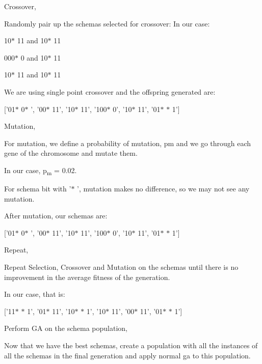 \documentclass[12pt]{article}
\renewcommand{\_}{\kern-1.5pt\textunderscore\kern-1.5pt}
\begin{document}
Crossover, \par

Randomly pair up the schemas selected for crossover: In our case:\par

10$\ast$ 11 and 10$\ast$ 11\par

000$\ast$ 0 and 10$\ast$ 11\par

10$\ast$ 11 and 10$\ast$ 11\par

We are using single point crossover and the offspring generated are:\par

[’01$\ast$ 0$\ast$ ’, ’00$\ast$ 11’, ’10$\ast$ 11’, ’100$\ast$ 0’, ’10$\ast$ 11’, ’01$\ast$ $\ast$ 1’]\par

Mutation, \par

For mutation, we define a probability of mutation, pm and we go through each gene of the chromosome and mutate them.\par

In our case, p\textsubscript{m} = 0.02.\par

For schema bit with ’$\ast$ ’, mutation makes no difference, so we may not see any mutation. \par

After mutation, our schemas are:\par

[’01$\ast$ 0$\ast$ ’, ’00$\ast$ 11’, ’10$\ast$ 11’, ’100$\ast$ 0’, ’10$\ast$ 11’, ’01$\ast$ $\ast$ 1’]\par

Repeat, \par

Repeat Selection, Crossover and Mutation on the schemas until there is no improvement in the average fitness of the generation.\par

In our case, that is:\par

[’11$\ast$ $\ast$ 1’, ’01$\ast$ 11’, ’10$\ast$ $\ast$ 1’, ’10$\ast$ 11’, ’00$\ast$ 11’, ’01$\ast$ $\ast$ 1’]\par

Perform GA on the schema population, \par

Now that we have the best schemas, create a population with all the instances of all the schemas in the final generation and apply normal ga to this population.\par
\end{document}
